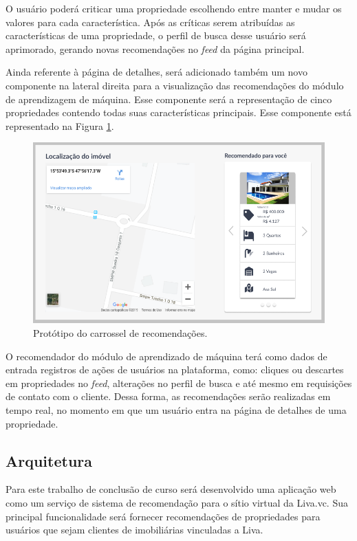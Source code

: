 O usuário poderá criticar uma propriedade escolhendo entre manter e mudar os valores para cada característica. Após as críticas serem atribuídas as características de uma propriedade, o perfil de busca desse usuário será aprimorado, gerando novas recomendações no \textit{feed} da página principal.

Ainda referente à página de detalhes, será adicionado também um novo componente na lateral direita para a visualização das recomendações do módulo de aprendizagem de máquina. Esse componente será a representação de cinco propriedades contendo todas suas características principais. Esse componente está representado na Figura \ref{fig:prototipo_recommender_system}.

\begin{figure}[H]
    \centering
    \includegraphics[scale=0.53]{figuras/proposta/prototipo_recommender_system.png}
    \caption[Protótipo do carrossel de recomendações]{Protótipo do carrossel de recomendações.}
    \label{fig:prototipo_recommender_system}
\end{figure}

O recomendador do módulo de aprendizado de máquina terá como dados de entrada registros de ações de usuários na plataforma, como: cliques ou descartes em propriedades no \textit{feed}, alterações no perfil de busca e até mesmo em requisições de contato com o cliente. Dessa forma, as recomendações serão realizadas em tempo real, no momento em que um usuário entra na página de detalhes de uma propriedade.

\subsection{Arquitetura}

Para este trabalho de conclusão de curso será desenvolvido uma aplicação web como um serviço de sistema de recomendação para o sítio virtual da Liva.vc. Sua principal funcionalidade será fornecer recomendações de propriedades para usuários que sejam clientes de imobiliárias vinculadas a Liva.

